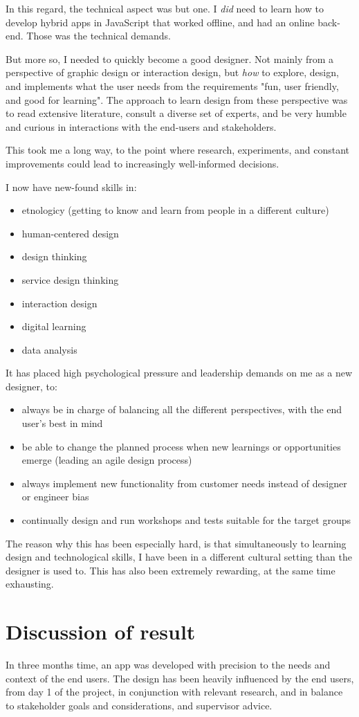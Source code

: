 In this regard, the technical aspect was but one. I \textit{did} need to learn how to develop hybrid apps in JavaScript that worked offline, and had an online back-end. Those was the technical demands. 

But more so, I needed to quickly become a good designer. Not mainly from a perspective of graphic design or interaction design, but \textit{how} to explore, design, and implements what the user needs from the requirements "fun, user friendly, and good for learning". The approach to learn design from these perspective was to read extensive literature, consult a diverse set of experts, and be very humble and curious in interactions with the end-users and stakeholders. 

This took me a long way, to the point where research, experiments, and constant improvements could lead to increasingly well-informed decisions.

I now have new-found skills in:
\begin{itemize}
\item etnologicy (getting to know and learn from people in a different culture)
\item human-centered design
\item design thinking
\item service design thinking
\item interaction design
\item digital learning
\item data analysis
\end{itemize}

It has placed high psychological pressure and leadership demands on me as a new designer, to:
\begin{itemize}
\item always be in charge of balancing all the different perspectives, with the end user's best in mind
\item be able to change the planned process when new learnings or opportunities emerge (leading an agile design process)
\item always implement new functionality from customer needs instead of designer or engineer bias
\item continually design and run workshops and tests suitable for the target groups
\end{itemize}

The reason why this has been especially hard, is that simultaneously to learning design and technological skills, I have been in a different cultural setting than the designer is used to. This has also been extremely rewarding, at the same time exhausting.

\section{Discussion of result}
In three months time, an app was developed with precision to the needs and context of the end users. The design has been heavily influenced by the end users, from day 1 of the project, in conjunction with relevant research, and in balance to stakeholder goals and considerations, and supervisor advice. 